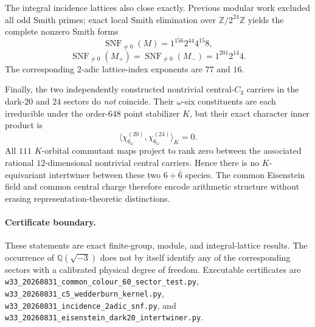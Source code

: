 The integral incidence lattices also close exactly.  Previous modular work
excluded all odd Smith primes; exact local Smith elimination over
$\mathbb Z/2^{24}\mathbb Z$ yields the complete nonzero Smith forms
\[
 \boxed{\operatorname{SNF}_{\ne0}(M)=1^{156}2^{44}4^{15}8,}
\]
\[
 \boxed{\operatorname{SNF}_{\ne0}(M_+)
       =\operatorname{SNF}_{\ne0}(M_-)=1^{201}2^{14}4.}
\]
The corresponding $2$-adic lattice-index exponents are $77$ and $16$.

Finally, the two independently constructed nontrivial central-$C_3$ carriers
in the dark-$20$ and $24$ sectors do \emph{not} coincide.  Their
$\omega$-six constituents are each irreducible under the order-$648$ point
stabilizer $K$, but their exact character inner product is
\[
 \boxed{\langle\chi^{(20)}_{6_\omega},
              \chi^{(24)}_{6_\omega}\rangle_K=0.}
\]
All $111$ $K$-orbital commutant maps project to rank zero between the associated
rational $12$-dimensional nontrivial central carriers.  Hence there is no
$K$-equivariant intertwiner between these two $6+\bar6$ species.  The common
Eisenstein field and common central charge therefore encode arithmetic
structure without erasing representation-theoretic distinctions.

\paragraph{Certificate boundary.}
These statements are exact finite-group, module, and integral-lattice
results.  The occurrence of $\mathbb Q(\sqrt{-3})$ does not by itself identify
any of the corresponding sectors with a calibrated physical degree of
freedom.  Executable certificates are
\texttt{w33\_20260831\_common\_colour\_60\_sector\_test.py},
\texttt{w33\_20260831\_c5\_wedderburn\_kernel.py},
\texttt{w33\_20260831\_incidence\_2adic\_snf.py}, and
\texttt{w33\_20260831\_eisenstein\_dark20\_intertwiner.py}.
